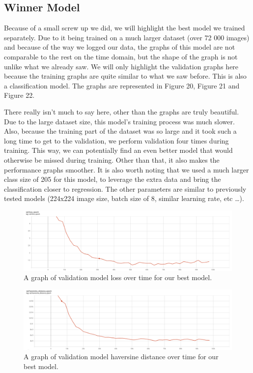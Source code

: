 \documentclass[]{article}
\begin{document}
\hypertarget{winner-model}{%
\subsection{Winner Model}\label{winner-model}}

Because of a small screw up we did, we will highlight the best model we
trained separately. Due to it being trained on a much larger dataset
(over 72 000 images) and because of the way we logged our data, the
graphs of this model are not comparable to the rest on the time domain,
but the shape of the graph is not unlike what we already saw. We will
only highlight the validation graphs here because the training graphs
are quite similar to what we saw before. This is also a classification
model. The graphs are represented in Figure 20, Figure 21 and Figure 22.

There really isn't much to say here, other than the graphs are truly
beautiful. Due to the large dataset size, this model's training process
was much slower. Also, because the training part of the dataset was so
large and it took such a long time to get to the validation, we perform
validation four times during training. This way, we can potentially find
an even better model that would otherwise be missed during training.
Other than that, it also makes the performance graphs smoother. It is
also worth noting that we used a much larger class size of 205 for this
model, to leverage the extra data and bring the classification closer to
regression. The other parameters are similar to previously tested models
(224x224 image size, batch size of 8, similar learning rate, etc
\ldots{}).

\begin{figure}
\centering
\includegraphics[width=1\textwidth,height=\textheight]{./tex2pdf.-3ffa51a14b505aec/512822ce9f8ceb384d06c8fd1e5d8c4a1c85f967.png}
\caption{A graph of validation model loss over time for our best model.}
\end{figure}

\begin{figure}
\centering
\includegraphics[width=1\textwidth,height=\textheight]{./tex2pdf.-3ffa51a14b505aec/2cd5da35578bfb6c1d71c6a19de11f4856cc79bb.png}
\caption{A graph of validation model haversine distance over time for
our best model.}
\end{figure}
\end{document}
